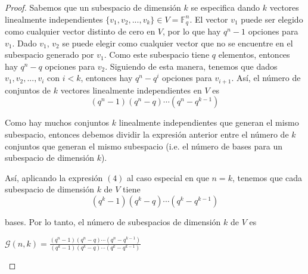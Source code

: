 \documentclass[letterpaper,11pt]{article}
\begin{document}
\begin{enumerate}
    \begin{proof}
        Sabemos que un subespacio de dimensión $k$ se especifica dando $k$
        vectores linealmente independientes $\{v_{1}, v_{2}, ..., v_{k}\}
        \in V = \mathbb{F}^{n}_{q}$. El vector $v_{1}$ puede ser elegido como 
        cualquier vector distinto de cero en $V$, por lo que hay $q^{n}-1$ 
        opciones para $v_{1}$. Dado $v_{1}$, $v_{2}$ se puede elegir como 
        cualquier vector que no se encuentre en el subespacio generado por 
        $v_{1}$. Como este subespacio tiene $q$ elementos, entonces hay 
        $q^{n} - q$ opciones para $v_{2}$. Siguiendo de esta manera, tenemos 
        que dados $v_{1}, v_{2},..., v_{i}$ con $i < k$, entonces hay 
        $q^{n}-q^{i}$ opciones para $v_{i+1}$. Así, el número de conjuntos de 
        $k$ vectores linealmente independientes en $V$ es
        \begin{equation}
            (q^{n}-1)(q^{n}-q)\cdots(q^{n}-q^{k-1})
        \end{equation}
        
        Como hay muchos conjuntos $k$ linealmente independientes que
        generan el mismo subespacio, entonces debemos dividir la expresión
        anterior entre el número de $k$ conjuntos que generan el mismo
        subespacio (i.e. el número de bases para un subespacio de dimensión 
        $k$).
        
        Así, aplicando la expresión $(4)$ al caso especial en que $n = k$, 
        tenemos que cada subespacio de dimensión $k$ de $V$ tiene
        \begin{equation}
            (q^{k}-1)(q^{k}-q)\cdots(q^{k}-q^{k-1})
        \end{equation}
        
        bases. Por lo tanto, el número de subespacios de dimensión $k$ de $V$ 
        es 
        \begin{center}
            $\mathcal{G}(n, k) = \frac{(q^{n}-1)(q^{n}-q)\cdots(q^{n}-q^{k-1})}
                                    {(q^{k}-1)(q^{k}-q)\cdots(q^{k}-q^ {k-1})}$
        \end{center}
    \end{proof}


\end{enumerate}
\end{document}
